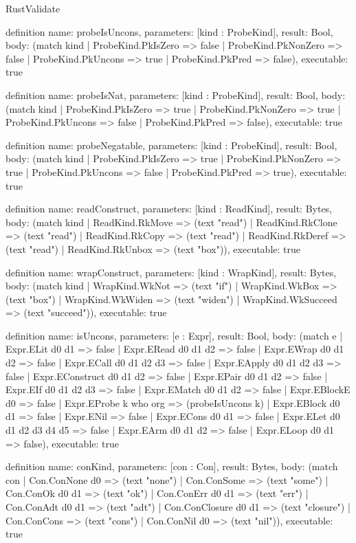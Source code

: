 \begin{lexlean}{RustValidate}
\begin{semanticmodule}
definition{
  name: probeIsUncons,
  parameters: [kind : ProbeKind],
  result: Bool,
  body: (match kind
    | ProbeKind.PkIsZero => false
    | ProbeKind.PkNonZero => false
    | ProbeKind.PkUncons => true
    | ProbeKind.PkPred => false),
  executable: true
}

definition{
  name: probeIsNat,
  parameters: [kind : ProbeKind],
  result: Bool,
  body: (match kind
    | ProbeKind.PkIsZero => true
    | ProbeKind.PkNonZero => true
    | ProbeKind.PkUncons => false
    | ProbeKind.PkPred => false),
  executable: true
}

definition{
  name: probeNegatable,
  parameters: [kind : ProbeKind],
  result: Bool,
  body: (match kind
    | ProbeKind.PkIsZero => true
    | ProbeKind.PkNonZero => true
    | ProbeKind.PkUncons => false
    | ProbeKind.PkPred => true),
  executable: true
}

definition{
  name: readConstruct,
  parameters: [kind : ReadKind],
  result: Bytes,
  body: (match kind
    | ReadKind.RkMove => (text "read")
    | ReadKind.RkClone => (text "read")
    | ReadKind.RkCopy => (text "read")
    | ReadKind.RkDeref => (text "read")
    | ReadKind.RkUnbox => (text "box")),
  executable: true
}

definition{
  name: wrapConstruct,
  parameters: [kind : WrapKind],
  result: Bytes,
  body: (match kind
    | WrapKind.WkNot => (text "if")
    | WrapKind.WkBox => (text "box")
    | WrapKind.WkWiden => (text "widen")
    | WrapKind.WkSucceed => (text "succeed")),
  executable: true
}

definition{
  name: isUncons,
  parameters: [e : Expr],
  result: Bool,
  body: (match e
    | Expr.ELit d0 d1 => false
    | Expr.ERead d0 d1 d2 => false
    | Expr.EWrap d0 d1 d2 => false
    | Expr.ECall d0 d1 d2 d3 => false
    | Expr.EApply d0 d1 d2 d3 => false
    | Expr.EConstruct d0 d1 d2 => false
    | Expr.EPair d0 d1 d2 => false
    | Expr.EIf d0 d1 d2 d3 => false
    | Expr.EMatch d0 d1 d2 => false
    | Expr.EBlockE d0 => false
    | Expr.EProbe k who org => (probeIsUncons k)
    | Expr.EBlock d0 d1 => false
    | Expr.ENil => false
    | Expr.ECons d0 d1 => false
    | Expr.ELet d0 d1 d2 d3 d4 d5 => false
    | Expr.EArm d0 d1 d2 => false
    | Expr.ELoop d0 d1 => false),
  executable: true
}

definition{
  name: conKind,
  parameters: [con : Con],
  result: Bytes,
  body: (match con
    | Con.ConNone d0 => (text "none")
    | Con.ConSome => (text "some")
    | Con.ConOk d0 d1 => (text "ok")
    | Con.ConErr d0 d1 => (text "err")
    | Con.ConAdt d0 d1 => (text "adt")
    | Con.ConClosure d0 d1 => (text "closure")
    | Con.ConCons => (text "cons")
    | Con.ConNil d0 => (text "nil")),
  executable: true
}


\end{semanticmodule}
\end{lexlean}
